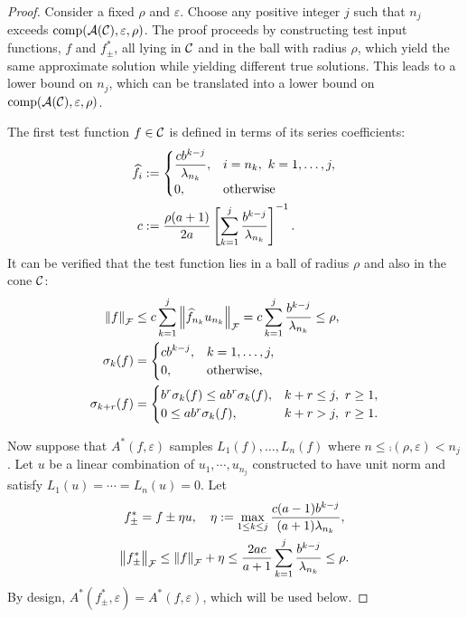 \documentclass[final]{elsarticle}
\theoremstyle{definition}
\theoremstyle{remark}
\begin{document}
\begin{proof}
Consider a fixed $\rho$ and $\varepsilon$.  Choose any positive integer $j$ such that $n_j$ exceeds $\operatorname{comp}(\mathcal{A}(\mathcal{C}),\varepsilon,\rho)$.  The proof proceeds by constructing test input functions, $f$ and $f^*_{\pm}$, all lying in $\mathcal{C}$ and in the ball with radius $\rho$, which yield the same approximate solution while yielding different true solutions.  This leads to a lower bound on $n_j$, which can be translated into a lower bound on $\operatorname{comp}(\mathcal{A}(\mathcal{C}),\varepsilon,\rho)$. 

The first test function $f \in \mathcal{C}$ is defined in terms of its series coefficients:
\begin{align}
\nonumber
\hf_i &:= \begin{cases}
\displaystyle
\frac{c b^{k-j}}{\lambda_{n_{k}}},  & i =  n_{k}, \ k = 1, \ldots, j,
\\
0, & \text{otherwise}
\end{cases}
\\
\label{cdef}
c &:= \frac{\rho (a+1)}{2a} \left[\sum_{k=1}^j \frac{b^{k-j}}{\lambda_{n_{k}}} \right]^{-1}.
\end{align}
It can be verified that the test function lies in a ball of radius $\rho$ and also in the cone $\mathcal{C}$:
\begin{align}
\label{testfunnorm}
\norm[\cf]{f} & \le c \sum_{k=1}^j \norm[\cf]{\hf_{n_k} u_{n_k}} = c \sum_{k=1}^j \frac{b^{k-j}}{\lambda_{n_{k}}}  \le \rho,
\\
\nonumber
\sigma_k(f) &= \begin{cases}
\displaystyle
c b^{k-j}, & k =1, \ldots, j, \\
0, & \text{otherwise},
\end{cases}
\\
\nonumber
\sigma_{k+r}(f) &= \begin{cases}
\displaystyle 
b^{r} \sigma_k(f) \le a b^r \sigma_k(f), & k+r \le j, \ r \ge 1,
\\
0 \le a b^r \sigma_k(f), & k+r > j, \ r \ge 1.
\end{cases}
\end{align}

Now suppose that $A^*(f,\varepsilon)$ samples $L_1(f), \ldots, L_n(f)$ where $n \le \comp(\rho,\varepsilon) < n_j$.  Let $u$ be a linear combination of $u_1, \cdots, u_{n_j}$ constructed to have unit norm and satisfy $L_1(u) = \cdots = L_n(u) = 0$.  Let 
\begin{gather}
\label{etadef}
f^*_\pm = f \pm \eta u, \quad \eta : = \max_{1 \le k \le j} \frac {c(a-1)b^{k-j}}{(a+1) \lambda_{n_k}}, \\
\nonumber
\norm[\cf]{f^*_\pm} \le \norm[\cf]{f} + \eta \le \frac{2ac}{a+1} \sum_{k=1}^j \frac{b^{k-j}}{\lambda_{n_{k}}}  \le \rho.
\end{gather} 
By design, $A^*(f^*_\pm,\varepsilon) = A^*(f,\varepsilon)$, which will be used below.


\end{proof}
\end{document}
